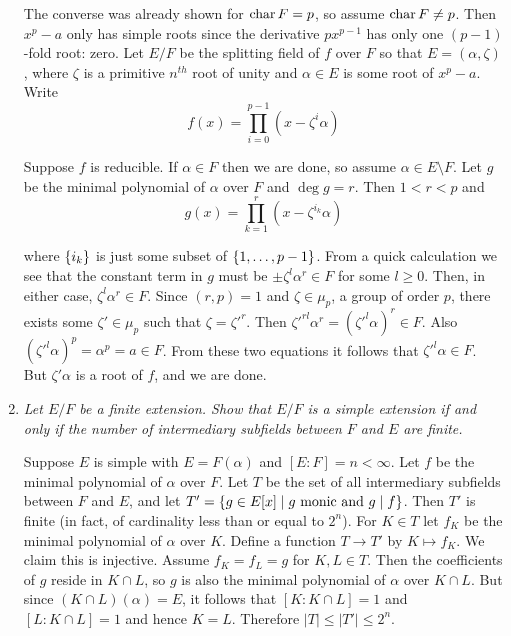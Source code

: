 \documentclass[10pt]{article}
\begin{document}
\begin{enumerate}
The converse was already shown for $\operatorname{char} F = p$, so assume $\operatorname{char} F \neq p$.  Then $x^p-a$ only has simple roots since the derivative $px^{p-1}$ has only one $(p-1)$-fold root: zero.  Let $E/F$ be the splitting field of $f$ over $F$ so that $E=(\alpha, \zeta)$, where $\zeta$ is a primitive $n^{th}$ root of unity and $\alpha \in E$ is some root of $x^p-a$.  Write
\[
f(x) = \prod_{i=0}^{p-1}(x - \zeta^i\alpha)
\]

Suppose $f$ is reducible.  If $\alpha \in F$ then we are done, so assume $\alpha \in E \setminus F$.  Let $g$ be the minimal polynomial of $\alpha$ over $F$ and $\deg g = r$.  Then $1 < r < p$ and
\[
g(x) = \prod_{k=1}^r (x - \zeta^{i_k}\alpha)
\]

where $\left\{ i_k \right\}$ is just some subset of $\left\{ 1, \ldots, p-1 \right\}$.  From a quick calculation we see that the constant term in $g$ must be $\pm \zeta^l\alpha^r \in F$ for some $l \geq 0$.  Then, in either case, $\zeta^l\alpha^r \in F$.  Since $(r,p) = 1$ and $\zeta \in \mu_p$, a group of order $p$, there exists some $\zeta' \in \mu_p$ such that $\zeta = \zeta'^r$.  Then $\zeta'^{rl}\alpha^r = (\zeta'^l\alpha)^r \in F$.  Also $(\zeta'^l\alpha)^p = \alpha^p = a \in F$.  From these two equations it follows that $\zeta'^l\alpha \in F$.  But $\zeta'\alpha$ is a root of $f$, and we are done.

\item \emph{Let $E/F$ be a finite extension.  Show that $E/F$ is a simple extension if and only if the number of intermediary subfields between $F$ and $E$ are finite.}

Suppose $E$ is simple with $E = F(\alpha)$ and $[E:F] = n < \infty$.  Let $f$ be the minimal polynomial of $\alpha$ over $F$.  Let $T$ be the set of all intermediary subfields between $F$ and $E$, and let $T' = \left\{ g \in E[x] \mid g \mbox{ monic and } g \mid f \right\}$.  Then $T'$ is finite (in fact, of cardinality less than or equal to $2^n$).  For $K \in T$ let $f_K$ be the minimal polynomial of $\alpha$ over $K$.  Define a function $T \rightarrow T'$ by $K \mapsto f_K$.  We claim this is injective.  Assume $f_K = f_L = g$ for $K,L \in T$.  Then the coefficients of $g$ reside in $K \cap L$, so $g$ is also the minimal polynomial of $\alpha$ over $K \cap L$.  But since $(K \cap L)(\alpha) = E$, it follows that $[K: K \cap L] = 1$ and $[L : K \cap L] = 1$ and hence $K = L$.  Therefore $|T| \leq |T'| \leq 2^n$.


\end{enumerate}
\end{document}

